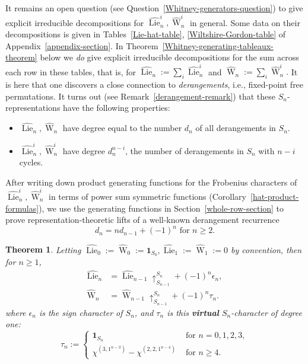 \documentclass[12pt]{amsart}
\theoremstyle{plain}
\newtheorem{thm}{Theorem}[section]
\theoremstyle{definition}
\begin{document}
It remains an open question 
(see Question~\ref{Whitney-generators-question}) 
to give explicit irreducible decompositions 
for $\widehat{{\operatorname{Lie}}}^i_n, \widehat{{\operatorname{W}}}^i_n$ in general.
Some data on their decompositions 
is given in Tables~\eqref{Lie-hat-table}, \eqref{Wiltshire-Gordon-table} of 
Appendix~\ref{appendix-section}.
In Theorem~\ref{Whitney-generating-tableaux-theorem} below we {\it do}
give explicit irreducible decompositions for the sum 
across each row in these tables, that is, for
$
\widehat{{\operatorname{Lie}}}_n:=\sum_i \widehat{{\operatorname{Lie}}}^i_n
$ 
and
$
\widehat{{\operatorname{W}}}_n:=\sum_i \widehat{{\operatorname{W}}}^i_n.
$
It is here that one discovers a close connection to {\it derangements}, i.e., 
fixed-point free permutations.  It turns out 
(see Remark~\ref{derangement-remark}) that these $S_n$-representations
have the following properties:
\begin{itemize}
\item
$\widehat{{\operatorname{Lie}}}_n, \widehat{{\operatorname{W}}}_n$ have degree equal to the number $d_n$
of all derangements in $S_n$.
\item $\widehat{{\operatorname{Lie}}}_n^i, \widehat{{\operatorname{W}}}^i_n$ have degree $d_n^{n-i}$, 
the number of derangements in $S_n$
with $n-i$ cycles.  
\end{itemize}
After writing down product generating functions for
the Frobenius characters of $\widehat{{\operatorname{Lie}}}_n^i, \widehat{{\operatorname{W}}}^i_n$ 
in terms of power sum symmetric functions (Corollary~\ref{hat-product-formulas}),
we use the generating functions in Section~\ref{whole-row-section}
to prove representation-theoretic lifts of a
well-known derangement recurrence
$$
d_n = n d_{n-1} + (-1)^n \text{ for }n \geq 2.
$$

\begin{thm}
\label{whole-row-inductive-description}
Letting $\widehat{{\operatorname{Lie}}}_0:=\widehat{{\operatorname{W}}}_0:={{\mathbf{1}}}_{S_0}, \widehat{{\operatorname{Lie}}}_1:=\widehat{{\operatorname{W}}}_1:=0$ by convention, then for $n \geq 1$,
\begin{align}
\label{DesWachs-derangement-recurrence}
\widehat{{\operatorname{Lie}}}_n &= \widehat{{\operatorname{Lie}}}_{n-1}\uparrow_{S_{n-1}}^{S_n} + (-1)^n 
  \epsilon_n,\\
\label{Whitney-derangement-recurrence}
\widehat{{\operatorname{W}}}_n &= \widehat{{\operatorname{W}}}_{n-1}\uparrow_{S_{n-1}}^{S_n} + (-1)^n 
  \tau_n.
\end{align}
where $\epsilon_n$ is the sign character of $S_n$,
and $\tau_n$ is this {\bf virtual} $S_n$-character of degree
one: 
$$
\tau_n:=
\begin{cases}
{{\mathbf{1}}}_{S_n} &\text{ for }n=0,1,2,3,\\
\chi^{(3,1^{n-3})}-\chi^{(2,2,1^{n-4})} &\text{ for }n \geq 4.
\end{cases}
$$
\end{thm}
\end{document}
